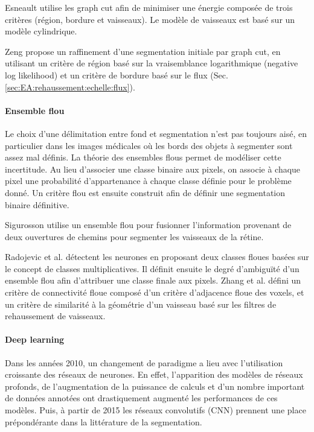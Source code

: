       Esneault \cite{Esneault2009_moments_graph_cut} utilise les graph cut afin de minimiser une énergie composée de trois critères (région, bordure et vaisseaux). Le modèle de vaisseaux est basé sur un modèle cylindrique.

      Zeng \cite{Zeng2017_liver_oof_graph_cut} propose un raffinement d'une segmentation initiale par graph cut, en utilisant un critère de région basé sur la vraisemblance logarithmique (negative log likelihood) et un critère de bordure basé sur le flux (Sec. \ref{sec:EA:rehaussement:echelle:flux}).

      \paragraph{Ensemble flou}

      Le choix d'une délimitation entre fond et segmentation n'est pas toujours aisé, en particulier dans les images médicales où les bords des objets à segmenter sont assez mal définis. La théorie des ensembles flous permet de modéliser cette incertitude. Au lieu d'associer une classe binaire aux pixels, on associe à chaque pixel une probabilité d'appartenance à chaque classe définie pour le problème donné. Un critère flou est ensuite construit afin de définir une segmentation binaire définitive.

      Sigurosson \cite{Sigurosson2014_retinal_morpho_fuzzy} utilise un ensemble flou pour fusionner l'information provenant de deux ouvertures de chemins pour segmenter les vaisseaux de la rétine. 

      Radojevic et al. \cite{Radojevic2015_fuzzy_logic} détectent les neurones en proposant deux classes floues basées sur le concept de classes multiplicatives. Il définit ensuite le degré d'ambiguïté d'un ensemble flou afin d'attribuer une classe finale aux pixels.
      Zhang et al. \cite{Zhang2018_liver_fuzzy_connectedness} défini un critère de connectivité floue composé d'un critère d'adjacence floue des voxels, et un critère de similarité à la géométrie d'un vaisseau basé sur les filtres de rehaussement de vaisseaux.  

      \paragraph{Deep learning}

      Dans les années 2010, un changement de paradigme a lieu avec l'utilisation croissante des réseaux de neurones. En effet, l'apparition des modèles de réseaux profonds, de l'augmentation de la puissance de calculs et d'un nombre important de données annotées ont drastiquement augmenté les performances de ces modèles. Puis, à partir de 2015 les réseaux convolutifs (CNN) prennent une place prépondérante dans la littérature de la segmentation. 
      
